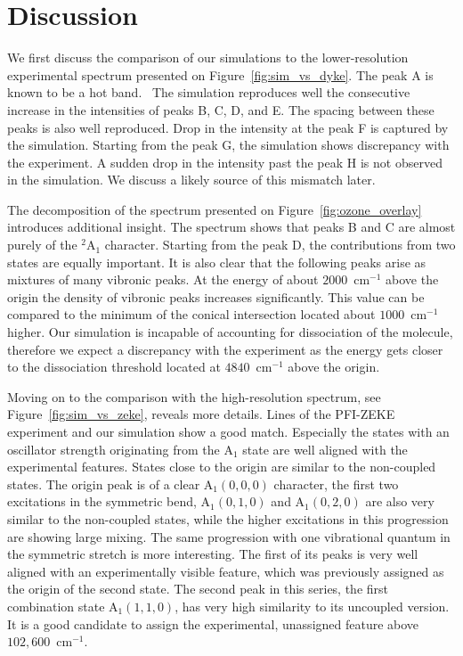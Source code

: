 \documentclass[12pt,a4paper,prb,aps,superscriptaddress]{revtex4}
\begin{document}
\section{Discussion} 

We first discuss the comparison of our simulations to the lower-resolution
experimental spectrum presented on Figure~\ref{fig:sim_vs_dyke}. The peak A is
known to be a hot band.~\cite{KDC:O3:92} The simulation reproduces well the
consecutive increase in the intensities of peaks B, C, D, and E. The spacing
between these peaks is also well reproduced. Drop in the intensity at the peak
F is captured by the simulation. Starting from the peak G, the simulation
shows discrepancy with the experiment. A sudden drop in the intensity past the
peak H is not observed in the simulation. We discuss a likely source of this
mismatch later.

The decomposition of the spectrum presented on Figure~\ref{fig:ozone_overlay}
introduces additional insight. The spectrum shows that peaks B and C are
almost purely of the $^2$A$_1$ character. Starting from the peak D, the
contributions from two states are equally important. It is also clear that the
following peaks arise as mixtures of many vibronic peaks. At the energy of
about $2000$~cm$^{-1}$ above the origin the density of vibronic peaks
increases significantly. This value can be compared to the minimum of the
conical intersection located about $1000$~cm$^{-1}$ higher. Our
simulation is incapable of accounting for dissociation of the molecule,
therefore we expect a discrepancy with the experiment as the energy gets
closer to the dissociation threshold located at $4840$~cm$^{-1}$ above the
origin.~\cite{Willitsch:O3ZEKE:2005}

Moving on to the comparison with the high-resolution spectrum, see
Figure~\ref{fig:sim_vs_zeke}, reveals more details. Lines of the PFI-ZEKE
experiment and our simulation show a good match. Especially the states with
an oscillator strength originating from the A$_1$ state are well aligned with
the experimental features. States close to the origin are similar to the
non-coupled states. The origin peak is of a clear A$_1(0,0,0)$ character, the
first two excitations in the symmetric bend, A$_1(0,1,0)$ and A$_1(0,2,0)$ are
also very similar to the non-coupled states, while the higher excitations in
this progression are showing large mixing. The same progression with one
vibrational quantum in the symmetric stretch is more interesting. The first of
its peaks is very well aligned with an experimentally visible feature, which
was previously assigned as the origin of the second state. The second peak in
this series, the first combination state A$_1(1,1,0)$, has very high
similarity to its uncoupled version. It is a good candidate to assign the
experimental, unassigned feature above $102,600$~cm$^{-1}$.
\end{document}
